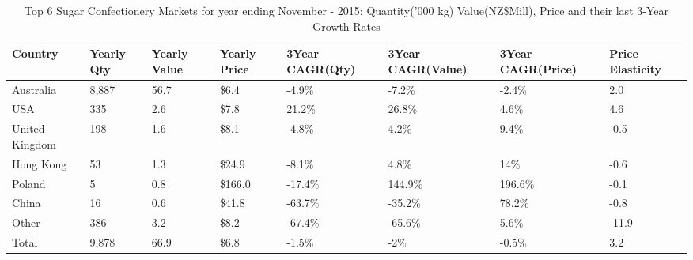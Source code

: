 \begin{table}[ht]
\centering
{\scriptsize
\begin{tabular}[t]{p{1.8cm}>{\hfill}p{1.4cm}>{\hfill}p{1.4cm}>{\hfill}p{1.6cm}>{\hfill}p{1.9cm}>{\hfill}p{2cm}>{\hfill}p{1.9cm}>{\hfill}p{1.5cm}}
 \textbf{Country} & \textbf{Yearly Qty} & \textbf{Yearly Value} & \textbf{Yearly Price} & \textbf{3Year CAGR(Qty)} & \textbf{3Year CAGR(Value)} & \textbf{3Year CAGR(Price)} & \textbf{Price Elasticity} \\
\hline
Australia & 8,887 & 56.7 & \$6.4 & -4.9\% & -7.2\% & -2.4\% & 2.0 \\  
USA & 335 & 2.6 & \$7.8 & 21.2\% & 26.8\% & 4.6\% & 4.6 \\  
United Kingdom & 198 & 1.6 & \$8.1 & -4.8\% & 4.2\% & 9.4\% & -0.5 \\  
Hong Kong & 53 & 1.3 & \$24.9 & -8.1\% & 4.8\% & 14\% & -0.6 \\  
Poland & 5 & 0.8 & \$166.0 & -17.4\% & 144.9\% & 196.6\% & -0.1 \\  
China & 16 & 0.6 & \$41.8 & -63.7\% & -35.2\% & 78.2\% & -0.8 \\  
Other & 386 & 3.2 & \$8.2 & -67.4\% & -65.6\% & 5.6\% & -11.9 \\  
Total & 9,878 & 66.9 & \$6.8 & -1.5\% & -2\% & -0.5\% & 3.2 \\  
\hline
\end{tabular}
}
\caption{\scriptsize Top 6 Sugar Confectionery Markets for year ending November - 2015: Quantity('000 kg) Value(NZ\$Mill), Price and their last 3-Year Growth Rates}
\end{table}

